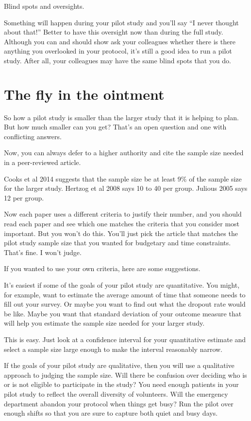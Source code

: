 \documentclass[
  letterpaper,
  DIV=11,
  numbers=noendperiod]{scrreprt}
\begin{document}
Blind spots and oversights.

Something will happen during your pilot study and you'll say ``I never
thought about that!'' Better to have this oversight now than during the
full study. Although you can and should show ask your colleagues whether
there is there anything you overlooked in your protocol, it's still a
good idea to run a pilot study. After all, your colleagues may have the
same blind spots that you do.

\section{The fly in the ointment}\label{the-fly-in-the-ointment-2}

So how a pilot study is smaller than the larger study that it is helping
to plan. But how much smaller can you get? That's an open question and
one with conflicting answers.

Now, you can always defer to a higher authority and cite the sample size
needed in a peer-reviewed article.

Cooks et al 2014 suggests that the sample size be at least 9\% of the
sample size for the larger study. Hertzog et al 2008 says 10 to 40 per
group. Julious 2005 says 12 per group.

Now each paper uses a different criteria to justify their number, and
you should read each paper and see which one matches the criteria that
you consider most important. But you won't do this. You'll just pick the
article that matches the pilot study sample size that you wanted for
budgetary and time constraints. That's fine. I won't judge.

If you wanted to use your own criteria, here are some suggestions.

It's easiest if some of the goals of your pilot study are quantitative.
You might, for example, want to estimate the average amount of time that
someone needs to fill out your survey. Or maybe you want to find out
what the dropout rate would be like. Maybe you want that standard
deviation of your outcome measure that will help you estimate the sample
size needed for your larger study.

This is easy. Just look at a confidence interval for your quantitative
estimate and select a sample size large enough to make the interval
reasonably narrow.

If the goals of your pilot study are qualitative, then you will use a
qualitative approach to judging the sample size. Will there be confusion
over deciding who is or is not eligible to participate in the study? You
need enough patients in your pilot study to reflect the overall
diversity of volunteers. Will the emergency department abandon your
protocol when things get busy? Run the pilot over enough shifts so that
you are sure to capture both quiet and busy days.
\end{document}
